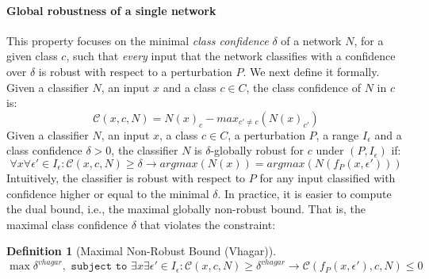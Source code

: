 \documentclass[11pt]{article}
\newtheorem{definition}{Definition}
\begin{document}
\paragraph{Global robustness of a single network}
This property focuses on the minimal \emph{class confidence} $\delta$ of a network $N$, for a given class $c$, such that \emph{every} input that the network classifies with a confidence over $\delta$ is robust with respect to a perturbation $P$. We next define it formally.
Given a classifier $N$, an input $x$ and a class $c\in{C}$, the class confidence of $N$ in $c$ is:
$$\mathcal{C}(x,c,N)=N(x)_{c}-max_{c'\ne c}(N(x)_{c'})$$
Given a classifier $N$, an input $x$, a class $c\in{C}$, a perturbation $P$, a range $I_\epsilon$ and a class confidence $\delta>0$, the classifier $N$ is $\delta$-globally robust for $c$ under $(P,I_\epsilon)$ if:\\
$$\forall{x}\forall{\epsilon'}\in{I_\epsilon}:    \mathcal{C}(x,c,N) \geq \delta \rightarrow argmax(N(x)) = argmax(N(f_P(x,\epsilon'))) $$
Intuitively, the classifier is robust with respect to $P$ for any input classified with confidence higher or equal to the minimal $\delta$. In practice, it is easier to compute the dual bound, i.e., the maximal globally non-robust bound. That is, the maximal class confidence $\delta$ that violates the constraint:
\begin{definition}[Maximal Non-Robust Bound (Vhagar)]\label{def:vhagar}
$$\max{\delta^{vhagar}}, \texttt{ subject to } \exists{x}\exists{\epsilon'}\in{I_\epsilon}: \mathcal{C}(x,c,N) \geq \delta^{vhagar} \rightarrow \mathcal{C}(f_P(x,\epsilon'),c,N)\leq 0$$
\end{definition}
\end{document}
